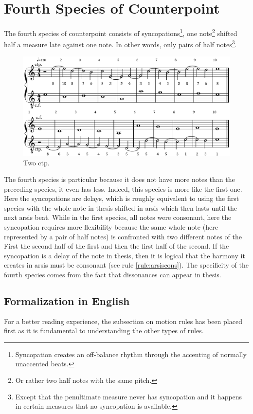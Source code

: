 \chapter{Fourth Species of Counterpoint}

The fourth species of counterpoint consists of syncopations\footnote{Syncopation creates an off-balance rhythm through the accenting of normally unaccented beats.}, one note\footnote{Or rather two half notes with the same pitch.} shifted half a measure late against one note. In other words, only pairs of half notes\footnote{Except that the penultimate measure never has syncopation and it happens in certain measures that no syncopation is available.}.
\begin{figure}[h]
    \centering
    \includegraphics[width=5in]{Images/the_fourth_species.png}
    \caption{Two  ctp.  }
\end{figure}

The fourth species is particular because it does not have more notes than the preceding species, it even has less. Indeed, this species is more like the first one. Here the syncopations are delays, which is roughly equivalent to using the first species with the whole note in thesis shifted in arsis which then lasts until the next arsis beat. While in the first species, all notes were consonant, here the syncopation requires more flexibility because the same whole note (here represented by a pair of half notes) is confronted with two different notes of the \cfdot First the second half of the first and then the first half of the second. If the syncopation is a delay of the note in thesis, then it is logical that the harmony it creates in arsis must be consonant (see rule \ref{rule:arsiscons}). The specificity of the fourth species comes from the fact that dissonances can appear in thesis.

\section{Formalization in English}
For a better reading experience, the subsection on motion rules has been placed first as it is fundamental to understanding the other types of rules.

